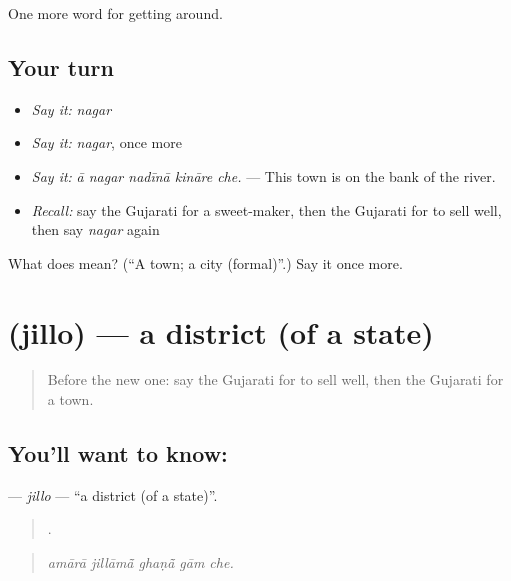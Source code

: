\begin{grammarlens}[title={What you've built}]
One more word for getting around.
\end{grammarlens}

\subsection*{Your turn}
\begin{itemize}
\raggedright
  \item \emph{Say it:} \emph{nagar}
  \item \emph{Say it:} \emph{nagar}, once more
  \item \emph{Say it:} \emph{ā nagar nadīnā kināre che.} — This town is on the bank of the river.
  \item \emph{Recall:} say the Gujarati for a sweet-maker, then the Gujarati for to sell well, then say \emph{nagar} again
\end{itemize}

\begin{tcolorbox}[breakable,colback=teal!4,colframe=teal!35!black,title={Before you move on}]
What does  mean? (\textquotedblleft{}A town; a city (formal)\textquotedblright{}.) Say it once more.
\end{tcolorbox}
\section[\texorpdfstring{\gu{જિલ્લો} (jillo)}{જિલ્લો (jillo)}]{ (jillo) — a district (of a state)}

\label{lesson:GU-C423-jillo}



\begin{quote}
Before the new one: say the Gujarati for to sell well, then the Gujarati for a town.
\end{quote}

\subsection*{You'll want to know: }
\textbf{} — \emph{jillo} — \textquotedblleft{}a district (of a state)\textquotedblright{}.

\begin{quote}
    .
\end{quote}

\begin{quote}
\emph{amārā jillāmā̃ ghaṇā̃ gām che.}
\end{quote}

